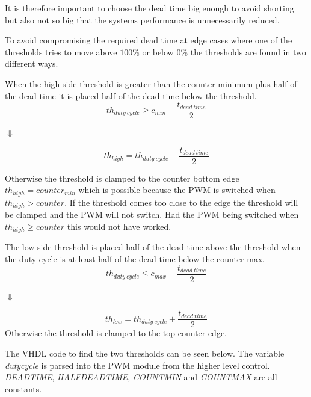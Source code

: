It is therefore important to choose the dead time big enough to avoid shorting but also not so big that the systems performance is unnecessarily reduced.

To avoid compromising the required dead time at edge cases where one of the thresholds tries to move above $100 \%$ or  below $0 \%$ the thresholds are found in two different ways.





When the high-side threshold is greater than the counter minimum plus half of the dead time it is placed half of the dead time below the threshold.
\begin{equation}
    th_{duty \ cycle} \geq  c_{min} + \frac{t_{dead \ time}}{2}
    \label{eq:threshold_high_condition}
\end{equation}
\begin{center}
    $\Downarrow$    
\end{center}
\begin{equation}
   th_{high} = th_{duty \ cycle} - \frac{t_{dead \ time}}{2}  
   \label{eq:threshold_high_equation}
\end{equation}

Otherwise the threshold is clamped to the counter bottom edge $th_{high} = counter_{min}$ which is possible because the PWM is switched when $th_{high} > counter$.
If the threshold comes too close to the edge the threshold will be clamped and the PWM will not switch. Had the PWM being switched when $th_{high} \geq counter$ this would not have worked.



The low-side threshold is placed half of the dead time above the threshold when the duty cycle is at least half of the dead time below the counter max.
\begin{equation}
    th_{duty \ cycle}\leq c_{max} - \frac{t_{dead \ time}}{2}
    \label{eq:threshold_low_condition}
\end{equation}
\begin{center}
    $\Downarrow$
\end{center}
\begin{equation}
  th_{low} = th_{duty \ cycle} + \frac{t_{dead \ time}}{2}  
  \label{eq:threshold_low_equation}
\end{equation}
Otherwise the threshold is clamped to the top counter edge.

The VHDL code to find the two thresholds can be seen below. The variable \textit{duty\textunderscore cycle} is parsed into the PWM module from the higher level control. \textit{DEADTIME}, \textit{HALF\textunderscore DEADTIME}, \textit{COUNT\textunderscore MIN} and \textit{COUNT\textunderscore MAX} are all constants.

